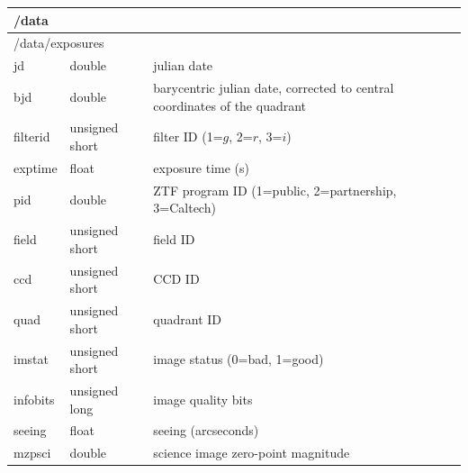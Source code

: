 \documentclass[12pt]{article}
\begin{document}
\begin{enumerate}
    \begin{table}[ht!]
    \centering
    \scriptsize
    \begin{tabular}{ |p{3.5cm}p{2.5cm}p{9cm}| }
     \hline
     \multicolumn{3}{|l|}{/data} \\
     \hline
     \multicolumn{3}{|l|}{\hspace{0.5cm}/data/exposures} \\
     \hspace{1.0cm}jd          &   double           &   julian date \\
     \hspace{1.0cm}bjd         &   double           &   barycentric julian date, corrected to central coordinates of the quadrant \\
     \rowcolor{LightGoldenrodYellow}
     \hspace{1.0cm}filterid    &   unsigned short   &   filter ID (1=$g$, 2=$r$, 3=$i$) \\
     \rowcolor{LightGoldenrodYellow}
     \hspace{1.0cm}exptime     &   float            &   exposure time (s) \\
     \hspace{1.0cm}pid         &   double           &   ZTF program ID (1=public, 2=partnership, 3=Caltech) \\
     \rowcolor{LightGoldenrodYellow}
     \hspace{1.0cm}field       &   unsigned short   &   field ID \\
     \rowcolor{LightGoldenrodYellow}
     \hspace{1.0cm}ccd         &   unsigned short   &   CCD ID \\
     \rowcolor{LightGoldenrodYellow}
     \hspace{1.0cm}quad        &   unsigned short   &   quadrant ID \\
     \rowcolor{LightGoldenrodYellow}
     \hspace{1.0cm}imstat      &   unsigned short   &   image status (0=bad, 1=good) \\
     \rowcolor{LightGoldenrodYellow}
     \hspace{1.0cm}infobits    &   unsigned long    &   image quality bits \\
     \rowcolor{LightGoldenrodYellow}
     \hspace{1.0cm}seeing      &   float            &   seeing (arcseconds) \\
     \rowcolor{LightGoldenrodYellow}
     \hspace{1.0cm}mzpsci      &   double           &   science image zero-point magnitude \\

\end{tabular}
\end{table}
\end{enumerate}
\end{document}
